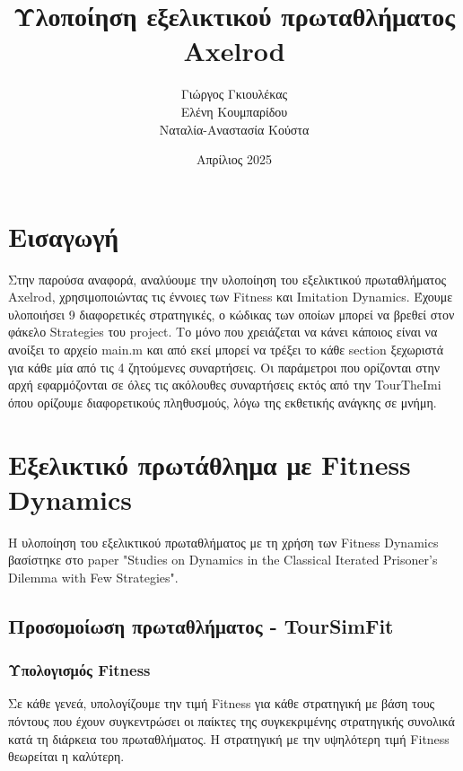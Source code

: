 \documentclass[a4paper,12pt]{article}
\title{Υλοποίηση εξελικτικού πρωταθλήματος \foreignlanguage{english}{Axelrod}}
\author{Γιώργος Γκιουλέκας \\ Ελένη Κουμπαρίδου \\ Ναταλία-Αναστασία Κούστα}
\date{Απρίλιος 2025}
\begin{document}
\maketitle
\tableofcontents

\section{Εισαγωγή}
Στην παρούσα αναφορά, αναλύουμε την υλοποίηση του εξελικτικού πρωταθλήματος \foreignlanguage{english}{Axelrod}, χρησιμοποιώντας τις έννοιες των \foreignlanguage{english}{Fitness} και \foreignlanguage{english}{Imitation Dynamics.} Έχουμε υλοποιήσει 9 διαφορετικές στρατηγικές, ο κώδικας των οποίων μπορεί να βρεθεί στον φάκελο \foreignlanguage{english}{Strategies} του \foreignlanguage{english}{project}. Το μόνο που χρειάζεται να κάνει κάποιος είναι να ανοίξει το αρχείο  \foreignlanguage{english}{main.m} και από εκεί μπορεί να τρέξει το κάθε \foreignlanguage{english}{section} ξεχωριστά για κάθε μία από τις 4 ζητούμενες συναρτήσεις. Οι παράμετροι που ορίζονται στην αρχή εφαρμόζονται σε όλες τις ακόλουθες συναρτήσεις εκτός από την \foreignlanguage{english}{TourTheImi} όπου ορίζουμε διαφορετικούς πληθυσμούς, λόγω της εκθετικής ανάγκης σε μνήμη.


\section{Εξελικτικό πρωτάθλημα με \foreignlanguage{english}{Fitness Dynamics}}
Η υλοποίηση του εξελικτικού πρωταθλήματος με τη χρήση των \foreignlanguage{english}{Fitness Dynamics} βασίστηκε στο \foreignlanguage{english}{paper} \foreignlanguage{english}{"Studies on Dynamics in the Classical Iterated Prisoner’s Dilemma with Few Strategies"}.

\subsection{Προσομοίωση πρωταθλήματος \foreignlanguage{english}{- TourSimFit}}


\subsubsection*{Υπολογισμός \foreignlanguage{english}{Fitness}}
Σε κάθε γενεά, υπολογίζουμε την τιμή \foreignlanguage{english}{Fitness} για κάθε στρατηγική με βάση τους πόντους που έχουν συγκεντρώσει οι παίκτες της συγκεκριμένης στρατηγικής συνολικά κατά τη διάρκεια του πρωταθλήματος. Η στρατηγική με την υψηλότερη τιμή \foreignlanguage{english}{Fitness} θεωρείται η καλύτερη.
\end{document}
